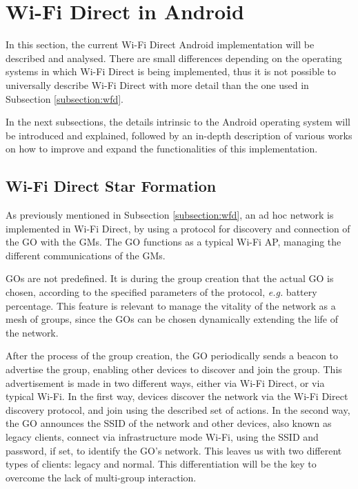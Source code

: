 
\section{Wi-Fi Direct in Android}
\label{sec:wfd}

In this section, the current Wi-Fi Direct Android implementation will be described and analysed. There are small differences depending on the operating systems in which Wi-Fi Direct is being implemented, thus it is not possible to universally describe Wi-Fi Direct with more detail than the one used in Subsection \ref{subsection:wfd}.

In the next subsections, the details intrinsic to the Android operating system will be introduced and explained, followed by an in-depth description of various works on how to improve and expand the functionalities of this implementation.

\subsection{Wi-Fi Direct Star Formation}
\label{subsection:wfdstar}

As previously mentioned in Subsection \ref{subsection:wfd}, an ad hoc network is implemented in Wi-Fi Direct, by using a protocol for discovery and connection of the \gls{GO} with the \glspl{GM}. The \gls{GO} functions as a typical Wi-Fi \gls{AP}, managing the different communications of the \glspl{GM}.

\glspl{GO} are not predefined. It is during the group creation that the actual \gls{GO} is chosen, according to the specified parameters of the protocol, \textit{e.g.} battery percentage. This feature is relevant to manage the vitality of the network as a mesh of groups, since the \glspl{GO} can be chosen dynamically extending the life of the network.

After the process of the group creation, the \gls{GO} periodically sends a beacon to advertise the group, enabling other devices to discover and join the group. This advertisement is made in two different ways, either via Wi-Fi Direct, or via typical Wi-Fi. In the first way, devices discover the network via the Wi-Fi Direct discovery protocol, and join using the described set of actions. In the second way, the \gls{GO} announces the \gls{SSID} of the network and other devices, also known as legacy clients, connect via infrastructure mode Wi-Fi, using the \gls{SSID} and password, if set, to identify the \gls{GO}'s network. This leaves us with two different types of clients: legacy and normal. This differentiation will be the key to overcome the lack of multi-group interaction.


